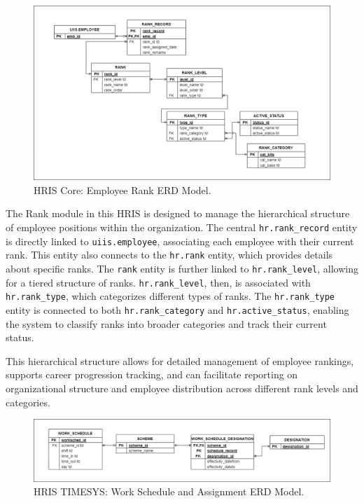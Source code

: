     \begin{figure}[H]
        \centering
        \includegraphics[width=1\linewidth]{figures/images/diagrams/erd/erd-core-rank.png}
        \caption{HRIS Core: Employee Rank ERD Model.}
        \label{fig:erd-core-rank}
    \end{figure}

    The Rank module in this HRIS is designed to manage the hierarchical structure of employee positions within the organization. The central \texttt{hr.rank\_record} entity is directly linked to \texttt{uiis.employee}, associating each employee with their current rank. This entity also connects to the \texttt{hr.rank} entity, which provides details about specific ranks. The \texttt{rank} entity is further linked to \texttt{hr.rank\_level}, allowing for a tiered structure of ranks. \texttt{hr.rank\_level}, then, is associated with \texttt{hr.rank\_type}, which categorizes different types of ranks. The \texttt{hr.rank\_type} entity is connected to both \texttt{hr.rank\_category} and \texttt{hr.active\_status}, enabling the system to classify ranks into broader categories and track their current status. 
            
    This hierarchical structure allows for detailed management of employee rankings, supports career progression tracking, and can facilitate reporting on organizational structure and employee distribution across different rank levels and categories.
    
    \begin{figure}[H]
        \centering
        \includegraphics[width=1\linewidth]{figures/images/diagrams/erd/erd-timesys-work-schedule-scheme-and-assignment.png}
        \caption{HRIS TIMESYS: Work Schedule and Assignment ERD Model.}
        \label{fig:erd-timesys-work-schedule-scheme-and-assignment}
    \end{figure}

